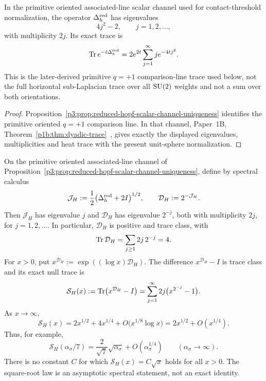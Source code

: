 \documentclass[12pt,a4paper]{article}
\begin{document}
\begin{theorem}
\label{p3:prop:hopf-spectral-trace}
\leavevmode\par\noindent
In the primitive oriented associated-line scalar channel used for
contact-threshold normalization, the operator \(\Delta_h^{\rm red}\) has
eigenvalues
\[
  4j^2-2,
  \qquad
  j=1,2,\dots,
\]
with multiplicity \(2j\).  Its exact trace is
\begin{equation}
\operatorname{Tr} e^{-t\Delta_h^{\rm red}}
=
2e^{2t}\sum_{j=1}^{\infty}j e^{-4tj^2}.
\end{equation}
This is the later-derived primitive \(q=+1\) comparison-line trace used below, not the full horizontal
sub-Laplacian trace over all \(\mathrm{SU}(2)\) weights and not a sum over both
orientations.
\end{theorem}
\begin{proof}
Proposition~\ref{p3:prop:reduced-hopf-scalar-channel-uniqueness} identifies
the primitive oriented \(q=+1\) comparison line.  In that channel,
Paper~1B, Theorem~\ref{p1b:thm:dyadic-trace}~\cite{Kugelmann2026Paper1B},
gives exactly the displayed eigenvalues, multiplicities and heat trace
with the present unit-sphere normalization.
\end{proof}

\begin{theorem}
\label{p3c:thm:dyadic-hopf-null-trace}
On the primitive oriented associated-line channel of
Proposition~\ref{p3:prop:reduced-hopf-scalar-channel-uniqueness}, define by
spectral calculus
\begin{equation}
 \mathcal J_H:=\frac12\bigl(\Delta_h^{\rm red}+2I\bigr)^{1/2},
 \qquad
 \mathcal D_H:=2^{-\mathcal J_H}.
\end{equation}
Then \(\mathcal J_H\) has eigenvalue \(j\) and \(\mathcal D_H\) has
eigenvalue \(2^{-j}\), both with multiplicity \(2j\), for
\(j=1,2,\ldots\).  In particular, \(\mathcal D_H\) is positive and trace
class, with
\begin{equation}
 \label{p3c:eq:dyadic-hopf-trace-class}
 \operatorname{Tr}\mathcal D_H=\sum_{j\ge1}2j\,2^{-j}=4.
\end{equation}
For \(x>0\), put
\(x^{\mathcal D_H}:=\exp((\log x)\mathcal D_H)\).  The difference
\(x^{\mathcal D_H}-I\) is trace class and its exact null trace is
\begin{equation}
 \label{p3c:eq:exact-dyadic-null-trace}
 \mathcal S_H(x)
 :=\operatorname{Tr}\bigl(x^{\mathcal D_H}-I\bigr)
 =\sum_{j=1}^{\infty}2j\bigl(x^{2^{-j}}-1\bigr).
\end{equation}
As \(x\to\infty\),
\begin{equation}
 \label{p3c:eq:dyadic-null-trace-asymptotic}
 \mathcal S_H(x)
 =2x^{1/2}+4x^{1/4}
   +O\!\bigl(x^{1/8}\log x\bigr)
 =2x^{1/2}+O(x^{1/4}).
\end{equation}
Thus, for example,
\[
 \mathcal S_H(\alpha_\sigma/7)
 =\frac{2}{\sqrt7}\sqrt{\alpha_\sigma}
   +O(\alpha_\sigma^{1/4})
 \qquad(\alpha_\sigma\to\infty).
\]
There is no constant \(C\) for which
\(\mathcal S_H(x)=C\sqrt{x}\) holds for all \(x>0\).  The square-root law
is an asymptotic spectral statement, not an exact identity.
\end{theorem}
\end{document}

